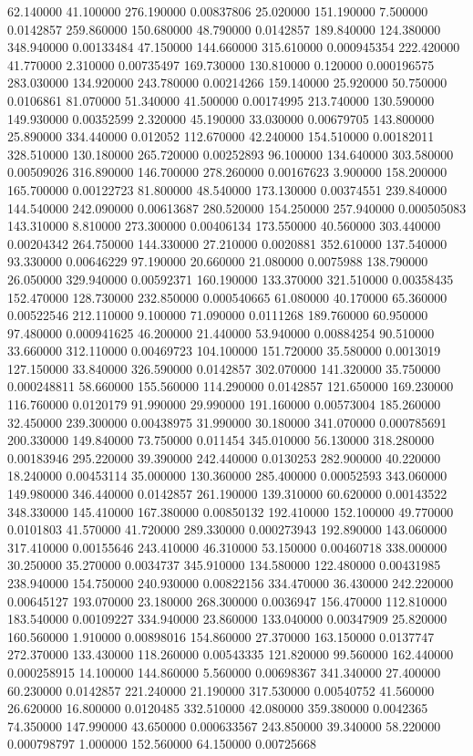 62.140000	41.100000	276.190000	0.00837806
25.020000	151.190000	7.500000	0.0142857
259.860000	150.680000	48.790000	0.0142857
189.840000	124.380000	348.940000	0.00133484
47.150000	144.660000	315.610000	0.000945354
222.420000	41.770000	2.310000	0.00735497
169.730000	130.810000	0.120000	0.000196575
283.030000	134.920000	243.780000	0.00214266
159.140000	25.920000	50.750000	0.0106861
81.070000	51.340000	41.500000	0.00174995
213.740000	130.590000	149.930000	0.00352599
2.320000	45.190000	33.030000	0.00679705
143.800000	25.890000	334.440000	0.012052
112.670000	42.240000	154.510000	0.00182011
328.510000	130.180000	265.720000	0.00252893
96.100000	134.640000	303.580000	0.00509026
316.890000	146.700000	278.260000	0.00167623
3.900000	158.200000	165.700000	0.00122723
81.800000	48.540000	173.130000	0.00374551
239.840000	144.540000	242.090000	0.00613687
280.520000	154.250000	257.940000	0.000505083
143.310000	8.810000	273.300000	0.00406134
173.550000	40.560000	303.440000	0.00204342
264.750000	144.330000	27.210000	0.0020881
352.610000	137.540000	93.330000	0.00646229
97.190000	20.660000	21.080000	0.0075988
138.790000	26.050000	329.940000	0.00592371
160.190000	133.370000	321.510000	0.00358435
152.470000	128.730000	232.850000	0.000540665
61.080000	40.170000	65.360000	0.00522546
212.110000	9.100000	71.090000	0.0111268
189.760000	60.950000	97.480000	0.000941625
46.200000	21.440000	53.940000	0.00884254
90.510000	33.660000	312.110000	0.00469723
104.100000	151.720000	35.580000	0.0013019
127.150000	33.840000	326.590000	0.0142857
302.070000	141.320000	35.750000	0.000248811
58.660000	155.560000	114.290000	0.0142857
121.650000	169.230000	116.760000	0.0120179
91.990000	29.990000	191.160000	0.00573004
185.260000	32.450000	239.300000	0.00438975
31.990000	30.180000	341.070000	0.000785691
200.330000	149.840000	73.750000	0.011454
345.010000	56.130000	318.280000	0.00183946
295.220000	39.390000	242.440000	0.0130253
282.900000	40.220000	18.240000	0.00453114
35.000000	130.360000	285.400000	0.00052593
343.060000	149.980000	346.440000	0.0142857
261.190000	139.310000	60.620000	0.00143522
348.330000	145.410000	167.380000	0.00850132
192.410000	152.100000	49.770000	0.0101803
41.570000	41.720000	289.330000	0.000273943
192.890000	143.060000	317.410000	0.00155646
243.410000	46.310000	53.150000	0.00460718
338.000000	30.250000	35.270000	0.0034737
345.910000	134.580000	122.480000	0.00431985
238.940000	154.750000	240.930000	0.00822156
334.470000	36.430000	242.220000	0.00645127
193.070000	23.180000	268.300000	0.0036947
156.470000	112.810000	183.540000	0.00109227
334.940000	23.860000	133.040000	0.00347909
25.820000	160.560000	1.910000	0.00898016
154.860000	27.370000	163.150000	0.0137747
272.370000	133.430000	118.260000	0.00543335
121.820000	99.560000	162.440000	0.000258915
14.100000	144.860000	5.560000	0.00698367
341.340000	27.400000	60.230000	0.0142857
221.240000	21.190000	317.530000	0.00540752
41.560000	26.620000	16.800000	0.0120485
332.510000	42.080000	359.380000	0.0042365
74.350000	147.990000	43.650000	0.000633567
243.850000	39.340000	58.220000	0.000798797
1.000000	152.560000	64.150000	0.00725668

